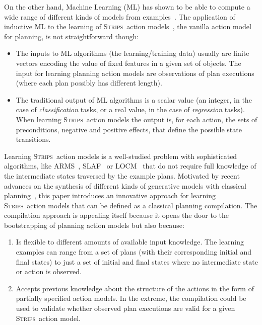 \documentclass[letterpaper]{article} %
\newcommand{\strips}{\textsc{Strips}}     %
\begin{document}
On the other hand, Machine Learning (ML) has shown to be able to compute a wide range of different kinds of models from examples~\cite{michalski2013machine}. The application of inductive ML to the learning of \strips\ action models~\cite{fikes1971strips}, the vanilla action model for planning, is not straightforward though:
\begin{itemize}
\item The inputs to ML algorithms (the learning/training data) usually are finite vectors encoding the value of fixed features in a given set of objects. The input for learning planning action models are observations of plan executions (where each plan possibly has different length).
\item The traditional output of ML algorithms is a scalar value (an integer, in the case of {\em classification} tasks, or a real value, in the case of {\em regression} tasks). When learning \strips\ action models the output is, for each action, the sets of preconditions, negative and positive effects, that define the possible state transitions.
\end{itemize}

Learning \strips\ action models is a well-studied problem with sophisticated algorithms, like {\sc ARMS}~\cite{yang2007learning}, {\sc SLAF}~\cite{amir:alearning:JAIR08} or {\sc LOCM}~\cite{cresswell2013acquiring} that do not require full knowledge of the intermediate states traversed by the example plans. Motivated by recent advances on the synthesis of different kinds of generative models with classical planning~\cite{bonet2009automatic,segovia2016hierarchical,segovia2017generating}, this paper introduces an innovative approach for learning \strips\ action models that can be defined as a classical planning compilation. The compilation approach is appealing itself because it opens the door to the bootstrapping of planning action models but also because:
\begin{enumerate}
\item Is flexible to different amounts of available input knowledge. The learning examples can range from a set of plans (with their corresponding initial and final states) to just a set of initial and final states where no intermediate state  or action is observed.
\item Accepts previous knowledge about the structure of the actions in the form of partially specified action models. In the extreme, the compilation could be used to validate whether observed plan executions are valid for a given \strips\ action model.
\end{enumerate}
\end{document}
